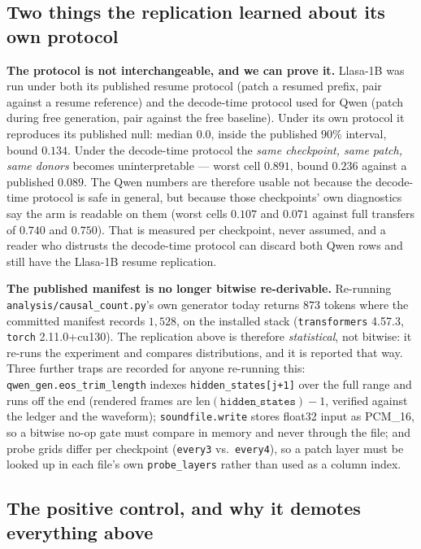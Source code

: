 \documentclass[11pt]{article}
\begin{document}
\subsection{Two things the replication learned about its own protocol}

\textbf{The protocol is not interchangeable, and we can prove it.} Llasa-1B was
run under both its published resume protocol (patch a resumed prefix, pair
against a resume reference) and the decode-time protocol used for Qwen (patch
during free generation, pair against the free baseline). Under its own protocol
it reproduces its published null: median $0.0$, inside the published $90\%$
interval, bound $0.134$. Under the decode-time protocol the \emph{same
checkpoint, same patch, same donors} becomes uninterpretable --- worst cell
$0.891$, bound $0.236$ against a published $0.089$. The Qwen numbers are
therefore usable not because the decode-time protocol is safe in general, but
because those checkpoints' own diagnostics say the arm is readable on them
(worst cells $0.107$ and $0.071$ against full transfers of $0.740$ and $0.750$).
That is measured per checkpoint, never assumed, and a reader who distrusts the
decode-time protocol can discard both Qwen rows and still have the Llasa-1B
resume replication.

\textbf{The published manifest is no longer bitwise re-derivable.} Re-running
\texttt{analysis/causal\_count.py}'s own generator today returns $873$ tokens
where the committed manifest records $1{,}528$, on the installed stack
(\texttt{transformers} 4.57.3, \texttt{torch} 2.11.0+cu130). The replication
above is therefore \emph{statistical}, not bitwise: it re-runs the experiment
and compares distributions, and it is reported that way. Three further traps
are recorded for anyone re-running this: \texttt{qwen\_gen.eos\_trim\_length}
indexes \texttt{hidden\_states[j+1]} over the full range and runs off the end
(rendered frames are $\text{len}(\texttt{hidden\_states}){-}1$, verified against
the ledger and the waveform); \texttt{soundfile.write} stores float32 input as
PCM\_16, so a bitwise no-op gate must compare in memory and never through the
file; and probe grids differ per checkpoint (\texttt{every3} vs.\
\texttt{every4}), so a patch layer must be looked up in each file's own
\texttt{probe\_layers} rather than used as a column index.

\subsection{The positive control, and why it demotes everything above}
\end{document}
